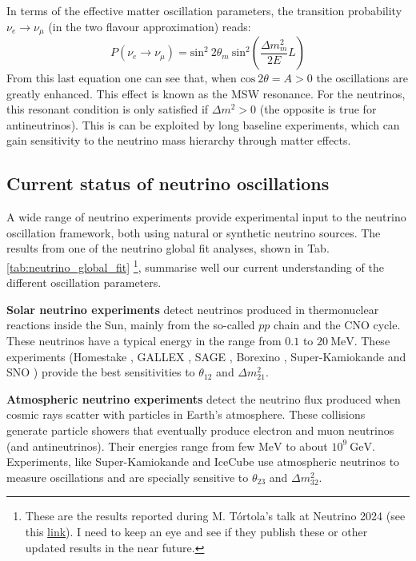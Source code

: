 In terms of the effective matter oscillation parameters, the transition probability $\nu_{e} \rightarrow \nu_{\mu}$ (in the two flavour approximation) reads:
\begin{equation}
	P(\nu_{e} \rightarrow \nu_{\mu}) = \mathrm{sin}^{2}~2\theta_{m} ~ \mathrm{sin}^{2}\left(\frac{\Delta m_{m}^{2}}{2E}L\right)
\end{equation}
From this last equation one can see that, when $\mathrm{cos}~2\theta = A > 0$ the oscillations are greatly enhanced. This effect is known as the MSW resonance. For the neutrinos, this resonant condition is only satisfied if $\Delta m^{2}>0$ (the opposite is true for antineutrinos). This is can be exploited by long baseline experiments, which can gain sensitivity to the neutrino mass hierarchy through matter effects.

\subsection{Current status of neutrino oscillations}

A wide range of neutrino experiments provide experimental input to the neutrino oscillation framework, both using natural or synthetic neutrino sources. The results from one of the neutrino global fit analyses, shown in Tab. \ref{tab:neutrino_global_fit} \footnote{These are the results reported during M. T\'{o}rtola's talk at Neutrino 2024 (see this \href{https://agenda.infn.it/event/37867/contributions/233956/attachments/121839/178002/MTortola-Neutrino2024.pdf}{link}). I need to keep an eye and see if they publish these or other updated results in the near future.}, summarise well our current understanding of the different oscillation parameters.

\textbf{Solar neutrino experiments} detect neutrinos produced in thermonuclear reactions inside the Sun, mainly from the so-called $pp$ chain and the CNO cycle. These neutrinos have a typical energy in the range from $0.1$ to $20 \ \mathrm{MeV}$. These experiments (Homestake \cite{Homestake1998}, GALLEX \cite{GALLEX2010}, SAGE \cite{SAGE2009}, Borexino \cite{Borexino2011}, Super-Kamiokande \cite{Super-Kamiokande2005} and SNO \cite{SNO2011}) provide the best sensitivities to $\theta_{12}$ and $\Delta m^{2}_{21}$.

\textbf{Atmospheric neutrino experiments} detect the neutrino flux produced when cosmic rays scatter with particles in Earth's atmosphere. These collisions generate particle showers that eventually produce electron and muon neutrinos (and antineutrinos). Their energies range from few $\mathrm{MeV}$ to about $10^{9} \ \mathrm{GeV}$. Experiments, like Super-Kamiokande \cite{Super-Kamiokande2017} and IceCube \cite{IceCube2017} use atmospheric neutrinos to measure oscillations and are specially sensitive to $\theta_{23}$ and $\Delta m^{2}_{32}$.

